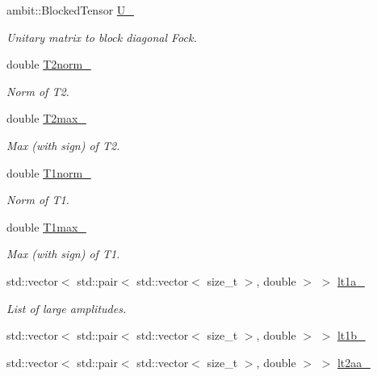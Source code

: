 \begin{DoxyCompactItemize}
ambit\+::\+Blocked\+Tensor \mbox{\hyperlink{classforte_1_1_d_s_r_g___m_r_p_t3_a3ffd43eb3dbaf441b72eb5f158eca6d2}{U\+\_\+}}
\begin{DoxyCompactList}\small\item\em Unitary matrix to block diagonal Fock. \end{DoxyCompactList}\item 
double \mbox{\hyperlink{classforte_1_1_d_s_r_g___m_r_p_t3_af22b0cb1620229a88e7988d3e564f368}{T2norm\+\_\+}}
\begin{DoxyCompactList}\small\item\em Norm of T2. \end{DoxyCompactList}\item 
double \mbox{\hyperlink{classforte_1_1_d_s_r_g___m_r_p_t3_a8f5e43d366ea5f4130f64ae882f484fb}{T2max\+\_\+}}
\begin{DoxyCompactList}\small\item\em Max (with sign) of T2. \end{DoxyCompactList}\item 
double \mbox{\hyperlink{classforte_1_1_d_s_r_g___m_r_p_t3_a4e586ce2fafa9c900df089d2f739cd5c}{T1norm\+\_\+}}
\begin{DoxyCompactList}\small\item\em Norm of T1. \end{DoxyCompactList}\item 
double \mbox{\hyperlink{classforte_1_1_d_s_r_g___m_r_p_t3_adacbd3ce8f65586ecd75c74c12b0db50}{T1max\+\_\+}}
\begin{DoxyCompactList}\small\item\em Max (with sign) of T1. \end{DoxyCompactList}\item 
std\+::vector$<$ std\+::pair$<$ std\+::vector$<$ size\+\_\+t $>$, double $>$ $>$ \mbox{\hyperlink{classforte_1_1_d_s_r_g___m_r_p_t3_a325f745173790dba2942214ca9c040e8}{lt1a\+\_\+}}
\begin{DoxyCompactList}\small\item\em List of large amplitudes. \end{DoxyCompactList}\item 
std\+::vector$<$ std\+::pair$<$ std\+::vector$<$ size\+\_\+t $>$, double $>$ $>$ \mbox{\hyperlink{classforte_1_1_d_s_r_g___m_r_p_t3_aba50c32ec211e470f442ed49a6bb16f5}{lt1b\+\_\+}}
\item 
std\+::vector$<$ std\+::pair$<$ std\+::vector$<$ size\+\_\+t $>$, double $>$ $>$ \mbox{\hyperlink{classforte_1_1_d_s_r_g___m_r_p_t3_aedbbe720462fe87709525bedc8541251}{lt2aa\+\_\+}}

\end{DoxyCompactItemize}
